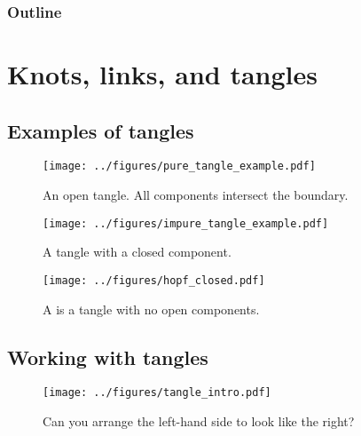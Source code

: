 \documentclass{beamer}
\title{\myTitle}
\author{\myName}
\date{\myTime}
\institute{\myUni~\\\myDepartment}
\begin{document}
\begin{frame}
        \titlepage
\end{frame}

\begin{frame}
        \frametitle{Outline}
        \tableofcontents[hideallsubsections]
\end{frame}

\section{Knots, links, and tangles}

\subsection{Examples of tangles}

\begin{frame}
        \begin{figure}
                \centering
                \texttt{[image: ../figures/pure\_tangle\_example.pdf]}
                \caption{An open tangle. All components intersect the boundary.}
                \label{fig:open_tangle}
        \end{figure}
\end{frame}

\begin{frame}
        \begin{figure}
        \centering
        \texttt{[image: ../figures/impure\_tangle\_example.pdf]}
        \caption{A tangle with a closed component.}
        \label{fig:impure_tangle}
\end{figure}
\end{frame}

\begin{frame}
        \begin{figure}
                \centering
                \texttt{[image: ../figures/hopf\_closed.pdf]}
                \caption{A  is a tangle with no open components.}
                \label{fig:hopf_closed}
        \end{figure}
\end{frame}

\subsection{Working with tangles}

\begin{frame}
\begin{figure}
        \centering
        \texttt{[image: ../figures/tangle\_intro.pdf]}
        \caption{Can you arrange the left-hand side to look like the right?}
        \label{fig:tangle_intro}
\end{figure}
\end{frame}
\end{document}
